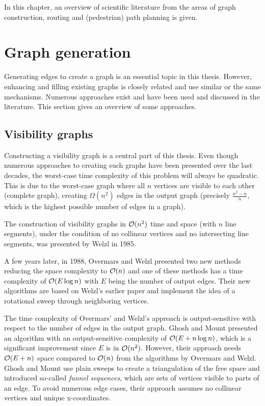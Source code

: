 
In this chapter, an overview of scientific literature from the areas of graph construction, routing and (pedestrian) path planning is given.

\section{Graph generation}
\label{sec:graph-generation}

	Generating edges to create a graph is an essential topic in this thesis.
	However, enhancing and filling existing graphs is closely related and use similar or the same mechanisms.
	Numerous approaches exist and have been used and discussed in the literature.
	This section gives an overview of some approaches.

	\subsection{Visibility graphs}
	\label{subsec:related-work:visibility-graph}

		Constructing a visibility graph is a central part of this thesis.
		Even though numerous approaches to creating such graphs have been presented over the last decades, the worst-case time complexity of this problem will always be quadratic.
		This is due to the worst-case graph where all $n$ vertices are visible to each other (complete graph), creating $\Omega(n^2)$ edges in the output graph (precisely $\frac{n^2-n}{n}$, which is the highest possible number of edges in a graph).
		
		The construction of visibility graphs in $\mathcal{O}(n^2)$ time and space (with $n$ line segments), under the condition of no collinear vertices and no intersecting line segments, was presented by Welzl in 1985\cite{welzl-visibility-graph}.
		
		A few years later, in 1988, Overmars and Welzl presented two new methods reducing the space complexity to $\mathcal{O}(n)$\cite{overmars-weizl-visibility-graph} and one of these methods has a time complexity of $\mathcal{O}(E \log n)$ with $E$ being the number of output edges.
		Their new algorithms are based on Welzl's earlier paper and implement the idea of a rotational sweep through neighboring vertices.
		
		The time complexity of Overmars' and Welzl's approach is output-sensitive with respect to the number of edges in the output graph\cite{ghosh-output-sensitive-vgraph}.
		Ghosh and Mount presented an algorithm with an output-sensitive complexity of $\mathcal{O}(E + n \log n)$, which is a significant improvement since $E$ is in $\mathcal{O}(n^2)$.
		However, their approach needs $\mathcal{O}(E + n)$ space compared to $\mathcal{O}(n)$ from the algorithms by Overmars and Welzl.
		Ghosh and Mount use plain sweeps to create a triangulation of the free space and introduced so-called \emph{funnel sequences}, which are sets of vertices visible to parts of an edge.
		To avoid numerous edge cases, their approach assumes no collinear vertices and unique x-coordinates.
		

